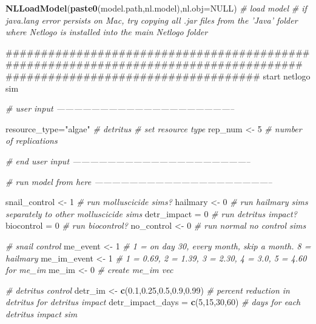 \documentclass[10,portrait]{article}
\newenvironment{Shaded}{\begin{snugshade}}{\end{snugshade}}
\newcommand{\KeywordTok}[1]{\textcolor[rgb]{0.13,0.29,0.53}{\textbf{#1}}}
\newcommand{\DataTypeTok}[1]{\textcolor[rgb]{0.13,0.29,0.53}{#1}}
\newcommand{\DecValTok}[1]{\textcolor[rgb]{0.00,0.00,0.81}{#1}}
\newcommand{\FloatTok}[1]{\textcolor[rgb]{0.00,0.00,0.81}{#1}}
\newcommand{\StringTok}[1]{\textcolor[rgb]{0.31,0.60,0.02}{#1}}
\newcommand{\CommentTok}[1]{\textcolor[rgb]{0.56,0.35,0.01}{\textit{#1}}}
\newcommand{\OtherTok}[1]{\textcolor[rgb]{0.56,0.35,0.01}{#1}}
\newcommand{\NormalTok}[1]{#1}
\begin{document}
\begin{Shaded}
\begin{Highlighting}[]
{{\KeywordTok{NLLoadModel}\NormalTok{(}\KeywordTok{paste0}\NormalTok{(model.path,nl.model),}\DataTypeTok{nl.obj=}\OtherTok{NULL}\NormalTok{) }\CommentTok{# load model  }
\CommentTok{# if java.lang error persists on Mac, try copying all .jar files from the 'Java' folder where Netlogo is installed into the main Netlogo folder     }

\NormalTok{#####################################################################################}
\NormalTok{####################################  start netlogo sim }

\CommentTok{# user input --------------------------------------------------------------}

\NormalTok{resource_type=}\StringTok{"algae"} \CommentTok{# detritus # set resource type}
\NormalTok{rep_num <-}\StringTok{ }\DecValTok{5} \CommentTok{# number of replications}

\CommentTok{# end user input --------------------------------------------------------------}





\CommentTok{# run model from here --------------------------------------------------------------}

\NormalTok{snail_control <-}\StringTok{ }\DecValTok{1} \CommentTok{# run molluscicide sims?}
\NormalTok{hailmary <-}\StringTok{ }\DecValTok{0} \CommentTok{# run hailmary sims separately to other molluscicide sims}
\NormalTok{detr_impact =}\StringTok{ }\DecValTok{0} \CommentTok{# run detritus impact?}
\NormalTok{biocontrol =}\StringTok{ }\DecValTok{0} \CommentTok{# run biocontrol?}
\NormalTok{no_control <-}\StringTok{ }\DecValTok{0} \CommentTok{# run normal no control sims}

\CommentTok{# snail control}
\NormalTok{me_event <-}\StringTok{ }\DecValTok{1} \CommentTok{# 1 = on day 30, every month, skip a month. 8 = hailmary}
\NormalTok{me_im_event <-}\StringTok{ }\DecValTok{1} \CommentTok{# 1 = 0.69, 2 = 1.39, 3 = 2.30, 4 = 3.0, 5 = 4.60 for me_im}
\NormalTok{me_im <-}\StringTok{ }\DecValTok{0} \CommentTok{# create me_im vec}

\CommentTok{# detritus control}
\NormalTok{detr_im <-}\StringTok{ }\KeywordTok{c}\NormalTok{(}\FloatTok{0.1}\NormalTok{,}\FloatTok{0.25}\NormalTok{,}\FloatTok{0.5}\NormalTok{,}\FloatTok{0.9}\NormalTok{,}\FloatTok{0.99}\NormalTok{) }\CommentTok{# percent reduction in detritus for detritus impact }
\NormalTok{detr_impact_days =}\StringTok{ }\KeywordTok{c}\NormalTok{(}\DecValTok{5}\NormalTok{,}\DecValTok{15}\NormalTok{,}\DecValTok{30}\NormalTok{,}\DecValTok{60}\NormalTok{) }\CommentTok{# days for each detritus impact sim }

}}
\end{Highlighting}
\end{Shaded}
\end{document}
